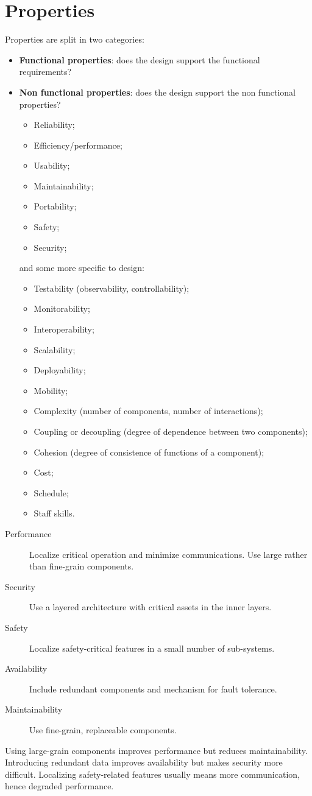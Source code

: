 \section{Properties}
Properties are split in two categories:
\begin{itemize}
\item \textbf{Functional properties}: does the design support the functional requirements?
\item \textbf{Non functional properties}: does the design support the non functional properties?
\begin{itemize}
\item Reliability;
\item Efficiency/performance;
\item Usability;
\item Maintainability;
\item Portability;
\item Safety;
\item Security;
\end{itemize}
and some more specific to design:
\begin{itemize}
\item Testability (observability, controllability);
\item Monitorability;
\item Interoperability;
\item Scalability;
\item Deployability;
\item Mobility;
\item Complexity (number of components, number of interactions);
\item Coupling or decoupling (degree of dependence between two components);
\item Cohesion (degree of consistence of functions of a component);
\item Cost;
\item Schedule;
\item Staff skills.
\end{itemize}
\end{itemize}

\begin{description}
\item [Performance] Localize critical operation and minimize communications. Use large rather than fine-grain components.
\item [Security] Use a layered architecture with critical assets in the inner layers.
\item [Safety] Localize safety-critical features in a small number of sub-systems.
\item [Availability] Include redundant components and mechanism for fault tolerance.
\item [Maintainability] Use fine-grain, replaceable components.
\end{description}
Using large-grain components improves performance but reduces maintainability. Introducing redundant data improves availability but makes security more difficult. Localizing safety-related features usually means more communication, hence degraded performance.

